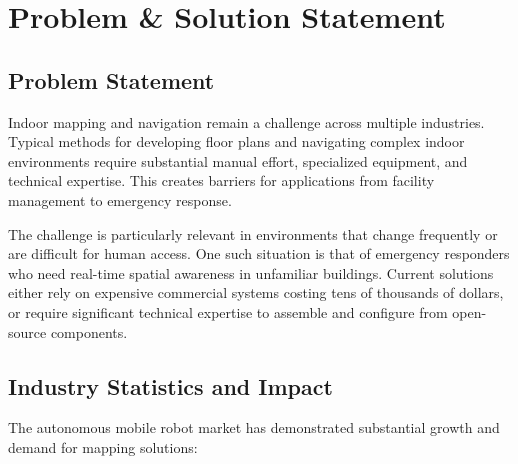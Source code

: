 
\section{Problem \& Solution Statement}

\subsection{Problem Statement}


Indoor mapping and navigation remain a challenge across multiple industries. Typical methods for developing floor plans and navigating complex indoor environments require substantial manual effort, specialized equipment, and technical expertise. This creates barriers for applications from facility management to emergency response.

The challenge is particularly relevant in environments that change frequently or are difficult for human access. One such situation is that of emergency responders who need real-time spatial awareness in unfamiliar buildings. Current solutions either rely on expensive commercial systems costing tens of thousands of dollars, or require significant technical expertise to assemble and configure from open-source components.

\subsection{Industry Statistics and Impact}

The autonomous mobile robot market has demonstrated substantial growth and demand for mapping solutions:

